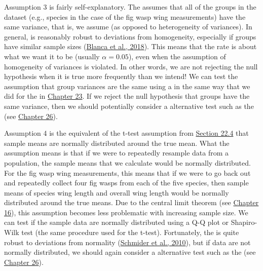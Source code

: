 \documentclass[
  openany]{krantz}
\begin{document}
Assumption 3 is fairly self-explanatory.
The  assumes that all of the groups in the dataset (e.g., species in the case of the fig wasp wing measurements) have the same variance, that is, we assume  (as opposed to heterogeneity of variances).
In general,  is reasonably robust to deviations from homogeneity, especially if groups have similar sample sizes (\protect\hyperlink{ref-Blanca2018}{Blanca et al., 2018}).
This means that the  rate is about what we want it to be (usually \(\alpha = 0.05\)), even when the assumption of homogeneity of variances is violated.
In other words, we are not rejecting the null hypothesis when it is true more frequently than we intend!
We can test the assumption that group variances are the same using a  in the same way that we did for the  in \protect\hyperlink{independent-samples-t-test-1}{Chapter 23}.
If we reject the null hypothesis that groups have the same variance, then we should potentially consider a  alternative test such as the  (see \protect\hyperlink{Chapter_26}{Chapter 26}).

Assumption 4 is the equivalent of the t-test assumption from \protect\hyperlink{assumptions-of-t-tests}{Section 22.4} that sample means are normally distributed around the true mean.
What the assumption means is that if we were to repeatedly resample data from a population, the sample means that we calculate would be normally distributed.
For the fig wasp wing measurements, this means that if we were to go back out and repeatedly collect four fig wasps from each of the five species, then sample means of species wing length and overall wing length would be normally distributed around the true means.
Due to the central limit theorem (see \protect\hyperlink{Chapter_16}{Chapter 16}), this assumption becomes less problematic with increasing sample size.
We can test if the sample data are normally distributed using a Q-Q plot or Shapiro-Wilk test (the same procedure used for the t-test).
Fortunately, the  is quite robust to deviations from normality (\protect\hyperlink{ref-Schmider2010}{Schmider et al., 2010}), but if data are not normally distributed, we should again consider a  alternative test such as the  (see \protect\hyperlink{Chapter_26}{Chapter 26}).
\end{document}

